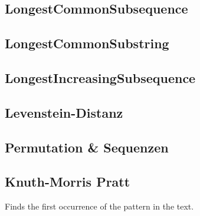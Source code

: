 \documentclass[10pt,a4paper,ngerman,oneside,]{article}
\begin{document}
\begin{multicols}{2}
\subsection{LongestCommonSubsequence}

\subsection{LongestCommonSubstring}

\subsection{LongestIncreasingSubsequence}

\subsection{Levenstein-Distanz}
\subsection{Permutation \& Sequenzen}

\subsection{Knuth-Morris Pratt}
Finds the first occurrence of the pattern in the text.



\end{multicols}
\end{document}
